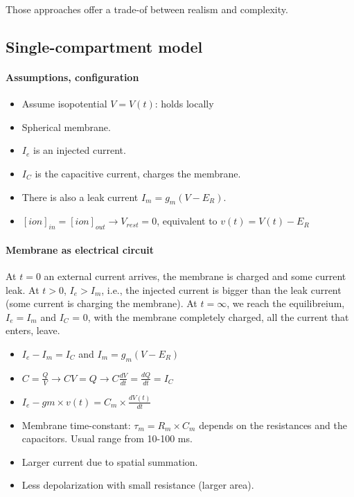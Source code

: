 \documentclass[main]{subfiles}
\begin{document}
Those approaches offer a trade-of between realism and complexity.

\subsection{Single-compartment model}

\paragraph{Assumptions, configuration}
\begin{itemize}[noitemsep,nolistsep]
	\item Assume isopotential $V = V(t)$: holds locally
	\item Spherical membrane.
	\item $I_e$ is an injected current.
	\item $I_C$ is the capacitive current, charges the membrane.
	\item There is also a leak current $I_m = g_m(V-E_R)$.
	\item $[ion]_{in} = [ion]_{out} \rightarrow V_{rest} = 0$, equivalent to $v(t) = V(t) - E_R$
\end{itemize}

\paragraph{Membrane as electrical circuit}

At $t = 0$ an external current arrives, the membrane is charged and some current leak. At $t > 0$, $I_e > I_m$, i.e., the injected current is bigger than the leak current (some current is charging the membrane). At $t = \infty$,  we reach the equilibreium, $I_e = I_m$ and $I_C$ = 0, with the membrane completely charged, all the current that enters, leave.

\begin{itemize}[noitemsep,nolistsep]
	\item $I_e  - I_m = I_C$ and $I_m=g_m(V-E_R)$
	\item $C = \frac{Q}{V} \rightarrow CV = Q \rightarrow C\frac{dV}{dt} = \frac{dQ}{dt} = I_C$
	\item $I_e - gm \times v(t) = C_m \times \frac{dV(t)}{dt}$
	\item Membrane time-constant: $\tau_m = R_m \times C_m$
	\subitem depends on the resistances and the capacitors. Usual range from 10-100 ms.
	\item Larger current due to spatial summation.
	\item Less depolarization with small resistance (larger area).
\end{itemize}
\end{document}
